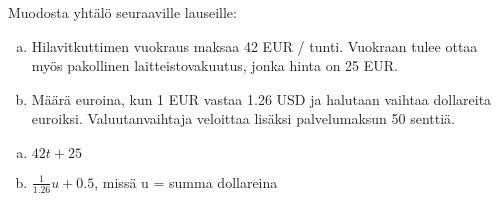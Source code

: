 \begin{tehtava}
    Muodosta yhtälö seuraaville lauseille:
    \begin{enumerate}[(a)]
        \item Hilavitkuttimen vuokraus maksaa 42 EUR / tunti. Vuokraan tulee ottaa myös pakollinen laitteistovakuutus, jonka hinta on 25 EUR.
        \item Määrä euroina, kun 1 EUR vastaa 1.26 USD ja halutaan vaihtaa dollareita euroiksi. Valuutanvaihtaja veloittaa lisäksi palvelumaksun 50 senttiä.
    \end{enumerate}
    \begin{vastaus}
        \begin{enumerate}[(a)]
            \item $42t + 25$
            \item $\frac{1}{1.26}u + 0.5$, missä u = summa dollareina
        \end{enumerate}
    \end{vastaus}
\end{tehtava}
